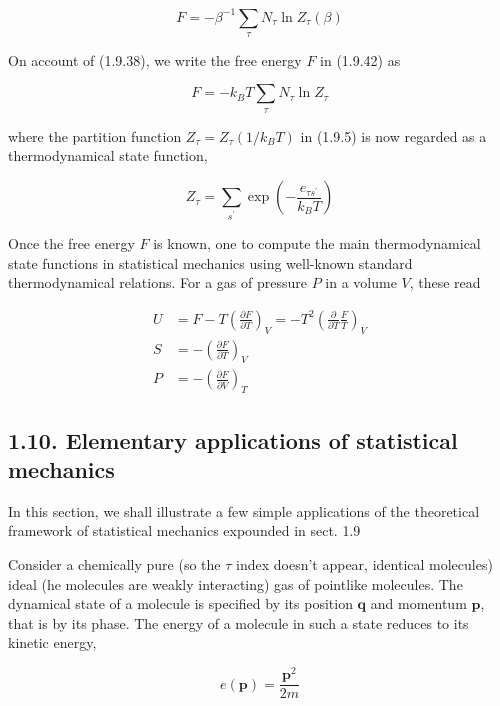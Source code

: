 \documentclass{article}
\begin{document}
\begin{equation*}
F=-\beta^{-1} \sum_{\tau} N_{\tau} \ln Z_{\tau}(\beta) \tag{1.9.42}
\end{equation*}


On account of (1.9.38), we write the free energy $F$ in (1.9.42) as

\begin{equation}
F=-k_{B} T \sum_{\tau} N_{\tau} \ln Z_{\tau} \tag{1.9.46}
\end{equation}

where the partition function $Z_{\tau}=Z_{\tau}\left(1 / k_{B} T\right)$ in (1.9.5) is now regarded as a thermodynamical state function,

\begin{equation*}
Z_{\tau}=\sum_{s^{\prime}} \exp \left(-\frac{e_{\tau s^{\prime}}}{k_{B} T}\right) \tag{1.9.47}
\end{equation*}


Once the free energy $F$ is known, one to compute the main thermodynamical state functions in statistical mechanics using well-known standard thermodynamical relations. For a gas of pressure $P$ in a volume $V$, these read
 
\begin{align*}
U & =F-T\left(\frac{\partial F}{\partial T}\right)_{V}=-T^{2}\left(\frac{\partial}{\partial T} \frac{F}{T}\right)_{V}  \tag{1.9.48}\\
S & =-\left(\frac{\partial F}{\partial T}\right)_{V}  \tag{1.9.49}\\
P & =-\left(\frac{\partial F}{\partial V}\right)_{T} \tag{1.9.50}
\end{align*}
 

\subsection*{1.10. Elementary applications of statistical mechanics}

In this section, we shall illustrate a few simple applications of the theoretical framework of statistical mechanics expounded in sect. 1.9

Consider a chemically pure (so the $\tau$ index doesn't appear, identical molecules) ideal (he molecules are weakly interacting) gas of pointlike molecules. The dynamical state of a molecule is specified by its position $\boldsymbol{q}$ and momentum $\boldsymbol{p}$, that is by its phase. The energy of a molecule in such a state reduces to its kinetic energy,

\begin{equation*}
e(\boldsymbol{p})=\frac{\boldsymbol{p}^{2}}{2 m} \tag{1.10.1}
\end{equation*}
\end{document}
